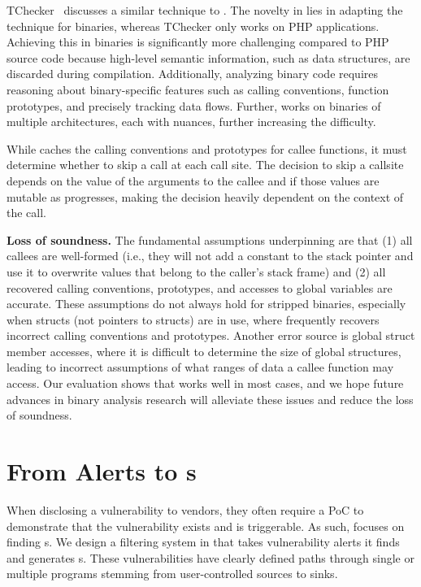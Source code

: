 TChecker~\cite{luo2022tchecker} discusses a similar technique to \assumed.
The novelty in \mango lies in adapting the technique for binaries, whereas TChecker only works on PHP applications.
Achieving this in binaries is significantly more challenging compared to PHP source code because high-level semantic information, such as data structures, are discarded during compilation.
Additionally, analyzing binary code requires reasoning about binary-specific features such as calling conventions, function prototypes, and precisely tracking data flows.
Further, \mango works on binaries of multiple architectures, each with nuances, further increasing the difficulty.

While \rda caches the calling conventions and prototypes for callee functions, it must determine whether to skip a call at each call site.
The decision to skip a callsite depends on the value of the arguments to the callee and if those values are mutable as \rda progresses, making the decision heavily dependent on the context of the call.

\smallskip
\noindent
\textbf{Loss of soundness.}
The fundamental assumptions underpinning \assumed are that (1) all callees are well-formed (i.e., they will not add a constant to the stack pointer and use it to overwrite values that belong to the caller's stack frame) and (2) all recovered calling conventions, prototypes, and accesses to global variables are accurate.
These assumptions do not always hold for stripped binaries, especially when structs (not pointers to structs) are in use, where \rda frequently recovers incorrect calling conventions and prototypes.
Another error source is global struct member accesses, where it is difficult to determine the size of global structures, leading to incorrect assumptions of what ranges of data a callee function may access.
Our evaluation shows that \assumed works well in most cases, and we hope future advances in binary analysis research will alleviate these issues and reduce the loss of soundness.


\section{From Alerts to \trupoc{}s}
\label{sec:alert-ranking}

When disclosing a vulnerability to vendors, they often require a PoC to demonstrate that the vulnerability exists and is triggerable.
As such, \mango focuses on finding \trupoc{}s.
We design a filtering system in \mango that takes vulnerability alerts it finds and generates \trupoc{}s.
These vulnerabilities have clearly defined paths through single or multiple programs stemming from user-controlled sources to sinks.


